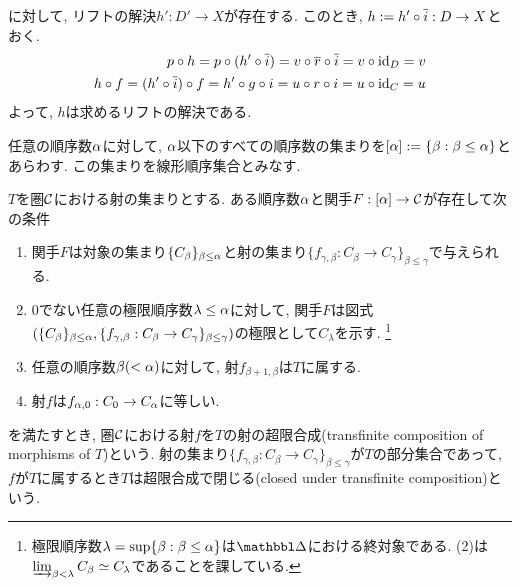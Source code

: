 \documentclass[uplatex, a4paper, 14Q, dvipdfmx]{jsreport}
\begin{document}
\begin{Proof}
\begin{center}
  \end{center}
  に対して, リフトの解決$h': D' \to X$が存在する. 
  このとき, $h:=h' \circ \overline{i}: D \to X$とおく. 
  \begin{align*}
    p \circ h = p \circ (h' \circ \overline{i}) = v \circ \overline{r} \circ \overline{i} = v \circ \mathrm{id}_D = v \\
    h \circ f = (h' \circ \overline{i}) \circ f = h' \circ g \circ i = u \circ r \circ i = u \circ \mathrm{id}_C =u
  \end{align*}
  よって, $h$は求めるリフトの解決である. 
\end{Proof}

\begin{definition}
  任意の順序数$\alpha$に対して, $\alpha$以下のすべての順序数の集まりを$[\alpha]:=\{\beta: \beta \leq \alpha\}$とあらわす. 
  この集まりを線形順序集合とみなす. 
\end{definition}

$T$を圏$\mathcal{C}$における射の集まりとする. 
ある順序数$\alpha$と関手$F: [\alpha] \to \mathcal{C}$が存在して次の条件
\begin{enumerate}
  \item 関手$F$は対象の集まり$\{C_{\beta}\}_{\beta \leq \alpha}$と射の集まり$\{f_{\gamma,\beta}: C_\beta \to C_\gamma\}_{\beta \leq \gamma}$で与えられる. 
  \item $0$でない任意の極限順序数$\lambda \leq \alpha$に対して, 関手$F$は図式$(\{C_{\beta}\}_{\beta \leq \alpha}, \{f_{\gamma,\beta}: C_\beta \to C_\gamma\}_{\beta \leq \gamma})$の極限として$C_\lambda$を示す. 
  \footnote{
    極限順序数$\lambda=\sup\{\beta: \beta \leq \alpha\}$は$\csim$における終対象である. 
    (2)は$\varinjlim_{\beta < \lambda} C_\beta \simeq C_{\lambda}$であることを課している. 
  }
  \item 任意の順序数$\beta (< \alpha)$に対して, 射$f_{\beta+1,\beta}$は$T$に属する. 
  \item 射$f$は$f_{\alpha,0}: C_0 \to C_\alpha$に等しい. 
\end{enumerate}
を満たすとき, 圏$\mathcal{C}$における射$f$を$T$の射の超限合成(transfinite composition of morphisms of $T$)という. 
射の集まり$\{f_{\gamma,\beta}: C_\beta \to C_\gamma\}_{\beta \leq \gamma}$が$T$の部分集合であって, $f$が$T$に属するとき$T$は超限合成で閉じる(closed under transfinite composition)という. 
\end{document}
